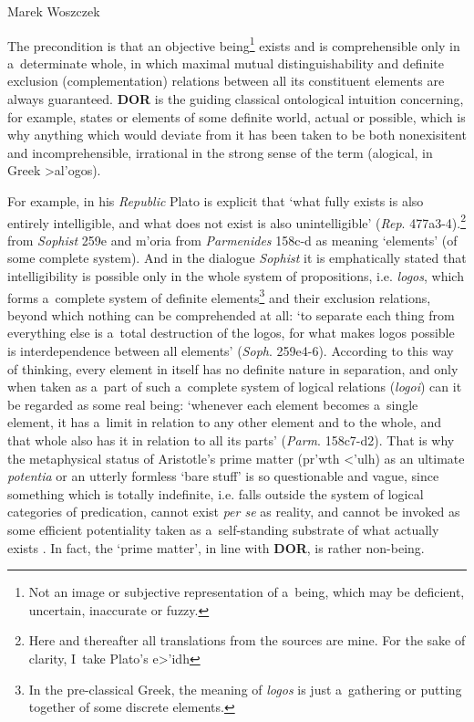 \begin{artengenv}{Marek Woszczek}


The precondition is that an objective being\footnote{Not an image or subjective representation of a~being, which may be deficient, uncertain, inaccurate or fuzzy. } exists and is comprehensible only in a~determinate whole, in which maximal mutual distinguishability and definite exclusion (complementation) relations between all its constituent elements are always guaranteed. \textbf{DOR} is the guiding classical ontological intuition concerning, for example, states or elements of some definite world, actual or possible, which is why anything which would deviate from it has been taken to be both nonexisitent and incomprehensible, irrational in the strong sense of the term (alogical, in Greek \textgreek{>al'ogos}).

For example, in his \textit{Republic} Plato is explicit that ‘what fully exists is also entirely intelligible, and what does not exist is also unintelligible' (\textit{Rep}. 477a3-4).\footnote{Here and thereafter all translations from the sources are mine. For the sake of clarity, I~take Plato's \textgreek{e>'idh}} from \textit{Sophist} 259e and \textgreek{m'oria} from \textit{Parmenides} 158c-d as meaning ‘elements' (of some complete system). And in the dialogue \textit{Sophist} it is emphatically stated that intelligibility is possible only in the whole system of propositions, i.e. \textit{logos}, which forms a~complete system of definite elements\footnote{In the pre-classical Greek, the meaning of \textit{logos} is just a~gathering or putting together of some discrete elements.} and their exclusion relations, beyond which nothing can be comprehended at all: ‘to separate each thing from everything else is a~total destruction of the logos, for what makes logos possible is interdependence between all elements' (\textit{Soph}. 259e4-6). According to this way of thinking, every element in itself has no definite nature in separation, and only when taken as a~part of such a~complete system of logical relations (\textit{logoi}) can it be regarded as some real being: ‘whenever each element becomes a~single element, it has a~limit in relation to any other element and to the whole, and that whole also has it in relation to all its parts' (\textit{Parm}. 158c7-d2). That is why the metaphysical status of Aristotle's prime matter (\textgreek{pr'wth <'ulh}) as an ultimate \textit{potentia} or an utterly formless ‘bare stuff' is so questionable and vague, since something which is totally indefinite, i.e. falls outside the system of logical categories of predication, cannot exist \textit{per se} as reality, and cannot be invoked as some efficient potentiality taken as a~self-standing substrate of what actually exists
\parencite[see e.g.][]{aristoteles_appendix_1992}. %
 In fact, the ‘prime matter', in line with \textbf{DOR}, is rather non-being.


\end{artengenv}
